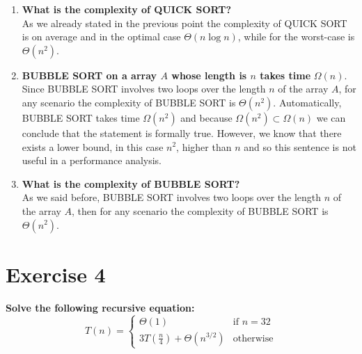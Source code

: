 \documentclass{article}
\begin{document}
\begin{enumerate}[label=(\alph*)]
		\item \textbf{What is the complexity of QUICK SORT?}\\
		As we already stated in the previous point the complexity of QUICK SORT is on average and in the optimal case $\Theta(n\log n)$, while for the worst-case is $\Theta(n^2)$.
		\item \textbf{BUBBLE SORT on a array $A$ whose length is $n$ takes time} $\Omega(n)$.
		Since BUBBLE SORT involves two loops over the length $n$ of the array $A$, for any scenario the complexity of BUBBLE SORT is $\Theta(n^2)$. Automatically, BUBBLE SORT takes time $\Omega(n^2)$ and because $\Omega(n^2) \subset \Omega(n) $ we can conclude that the statement is formally true. However, we know that there exists a lower bound, in this case $n^2$, higher than $n$ and so this sentence is not useful in a performance analysis. 
		\item  \textbf{What is the complexity of BUBBLE SORT?} \\
		As we said before,  BUBBLE SORT involves two loops over the length $n$ of the array $A$, then for any scenario the complexity of BUBBLE SORT is $\Theta(n^2)$. 
	\end{enumerate}

	\section*{Exercise 4}
	\textbf{Solve the following recursive equation:}
	$$
	T(n) = \begin{cases}
			\Theta(1) & \text{if } n= 32 \\
			3T(\frac{n}{4}) + \Theta(n^{3/2}) & \text{otherwise}
			\end{cases} 
	$$
	
\end{document}
